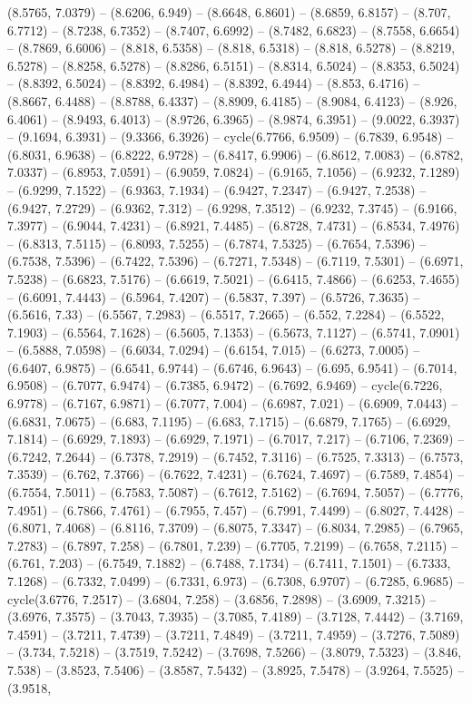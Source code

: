 (8.5765, 7.0379) -- (8.6206, 6.949) -- (8.6648, 6.8601) -- (8.6859, 6.8157) -- (8.707, 6.7712) -- (8.7238, 6.7352) -- (8.7407, 6.6992) -- (8.7482, 6.6823) -- (8.7558, 6.6654) -- (8.7869, 6.6006) -- (8.818, 6.5358) -- (8.818, 6.5318) -- (8.818, 6.5278) -- (8.8219, 6.5278) -- (8.8258, 6.5278) -- (8.8286, 6.5151) -- (8.8314, 6.5024) -- (8.8353, 6.5024) -- (8.8392, 6.5024) -- (8.8392, 6.4984) -- (8.8392, 6.4944) -- (8.853, 6.4716) -- (8.8667, 6.4488) -- (8.8788, 6.4337) -- (8.8909, 6.4185) -- (8.9084, 6.4123) -- (8.926, 6.4061) -- (8.9493, 6.4013) -- (8.9726, 6.3965) -- (8.9874, 6.3951) -- (9.0022, 6.3937) -- (9.1694, 6.3931) -- (9.3366, 6.3926) -- cycle(6.7766, 6.9509) -- (6.7839, 6.9548) -- (6.8031, 6.9638) -- (6.8222, 6.9728) -- (6.8417, 6.9906) -- (6.8612, 7.0083) -- (6.8782, 7.0337) -- (6.8953, 7.0591) -- (6.9059, 7.0824) -- (6.9165, 7.1056) -- (6.9232, 7.1289) -- (6.9299, 7.1522) -- (6.9363, 7.1934) -- (6.9427, 7.2347) -- (6.9427, 7.2538) -- (6.9427, 7.2729) -- (6.9362, 7.312) -- (6.9298, 7.3512) -- (6.9232, 7.3745) -- (6.9166, 7.3977) -- (6.9044, 7.4231) -- (6.8921, 7.4485) -- (6.8728, 7.4731) -- (6.8534, 7.4976) -- (6.8313, 7.5115) -- (6.8093, 7.5255) -- (6.7874, 7.5325) -- (6.7654, 7.5396) -- (6.7538, 7.5396) -- (6.7422, 7.5396) -- (6.7271, 7.5348) -- (6.7119, 7.5301) -- (6.6971, 7.5238) -- (6.6823, 7.5176) -- (6.6619, 7.5021) -- (6.6415, 7.4866) -- (6.6253, 7.4655) -- (6.6091, 7.4443) -- (6.5964, 7.4207) -- (6.5837, 7.397) -- (6.5726, 7.3635) -- (6.5616, 7.33) -- (6.5567, 7.2983) -- (6.5517, 7.2665) -- (6.552, 7.2284) -- (6.5522, 7.1903) -- (6.5564, 7.1628) -- (6.5605, 7.1353) -- (6.5673, 7.1127) -- (6.5741, 7.0901) -- (6.5888, 7.0598) -- (6.6034, 7.0294) -- (6.6154, 7.015) -- (6.6273, 7.0005) -- (6.6407, 6.9875) -- (6.6541, 6.9744) -- (6.6746, 6.9643) -- (6.695, 6.9541) -- (6.7014, 6.9508) -- (6.7077, 6.9474) -- (6.7385, 6.9472) -- (6.7692, 6.9469) -- cycle(6.7226, 6.9778) -- (6.7167, 6.9871) -- (6.7077, 7.004) -- (6.6987, 7.021) -- (6.6909, 7.0443) -- (6.6831, 7.0675) -- (6.683, 7.1195) -- (6.683, 7.1715) -- (6.6879, 7.1765) -- (6.6929, 7.1814) -- (6.6929, 7.1893) -- (6.6929, 7.1971) -- (6.7017, 7.217) -- (6.7106, 7.2369) -- (6.7242, 7.2644) -- (6.7378, 7.2919) -- (6.7452, 7.3116) -- (6.7525, 7.3313) -- (6.7573, 7.3539) -- (6.762, 7.3766) -- (6.7622, 7.4231) -- (6.7624, 7.4697) -- (6.7589, 7.4854) -- (6.7554, 7.5011) -- (6.7583, 7.5087) -- (6.7612, 7.5162) -- (6.7694, 7.5057) -- (6.7776, 7.4951) -- (6.7866, 7.4761) -- (6.7955, 7.457) -- (6.7991, 7.4499) -- (6.8027, 7.4428) -- (6.8071, 7.4068) -- (6.8116, 7.3709) -- (6.8075, 7.3347) -- (6.8034, 7.2985) -- (6.7965, 7.2783) -- (6.7897, 7.258) -- (6.7801, 7.239) -- (6.7705, 7.2199) -- (6.7658, 7.2115) -- (6.761, 7.203) -- (6.7549, 7.1882) -- (6.7488, 7.1734) -- (6.7411, 7.1501) -- (6.7333, 7.1268) -- (6.7332, 7.0499) -- (6.7331, 6.973) -- (6.7308, 6.9707) -- (6.7285, 6.9685) -- cycle(3.6776, 7.2517) -- (3.6804, 7.258) -- (3.6856, 7.2898) -- (3.6909, 7.3215) -- (3.6976, 7.3575) -- (3.7043, 7.3935) -- (3.7085, 7.4189) -- (3.7128, 7.4442) -- (3.7169, 7.4591) -- (3.7211, 7.4739) -- (3.7211, 7.4849) -- (3.7211, 7.4959) -- (3.7276, 7.5089) -- (3.734, 7.5218) -- (3.7519, 7.5242) -- (3.7698, 7.5266) -- (3.8079, 7.5323) -- (3.846, 7.538) -- (3.8523, 7.5406) -- (3.8587, 7.5432) -- (3.8925, 7.5478) -- (3.9264, 7.5525) -- (3.9518, 